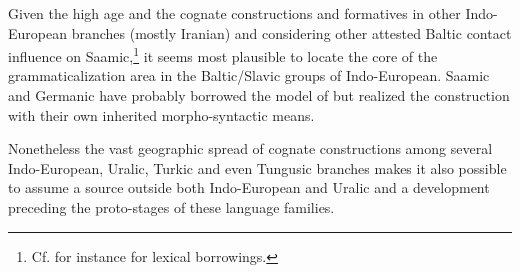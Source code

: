 Given the high age and the cognate constructions and formatives in other Indo-European branches (mostly Iranian) and considering other attested Baltic contact influence on Saamic,\footnote{Cf. for instance \citealt{riesler2009} for lexical borrowings.} it seems most plausible to locate the core of the grammaticalization area in the Baltic\slash{}Slavic groups of Indo-European. Saamic and Germanic have probably borrowed the model of  but realized the construction with their own inherited morpho-syntactic means.

Nonetheless the vast geographic spread of cognate constructions among several Indo-European, Uralic, Turkic and even Tungusic branches makes it also possible to assume a source outside both Indo-European and Uralic and a development preceding the proto-stages of these language families.
